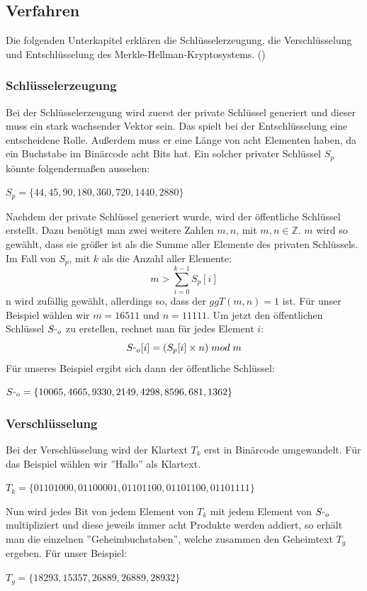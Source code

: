 \documentclass[a4paper,12pt,titlepage]{article}
\begin{document}
\subsection{Verfahren} 
Die folgenden Unterkapitel erklären die Schlüsselerzeugung, die Verschlüsselung und Entschlüsselung des Merkle-Hellman-Kryptosystems. (\cite{merklehellman_neer})
\subsubsection{Schlüsselerzeugung}
Bei der Schlüsselerzeugung wird zuerst der private Schlüssel generiert und dieser muss ein stark wachsender Vektor sein. Das spielt bei der Entschlüsselung eine entscheidene Rolle. Außerdem muss er eine Länge von acht Elementen haben, da ein Buchstabe im Binärcode acht Bits hat. Ein solcher privater Schlüssel $S_p$ könnte folgendermaßen aussehen:
\begin{center}
$S_p=\{44,45,90,180,360,720,1440,2880\}$
\end{center}
Nachdem der private Schlüssel generiert wurde, wird der öffentliche Schlüssel erstellt. Dazu benötigt man zwei weitere Zahlen $m,n$, mit $m,n \in \mathbb{Z}$. $m$ wird so gewählt, dass sie größer ist als die Summe aller Elemente des privaten Schlüssels. Im Fall von $S_p$, mit $k$ als die Anzahl aller Elemente:
\begin{equation*}
m > \sum_{i=0}^{k-1} S_p[i]
\end{equation*}
n wird zufällig gewählt, allerdings so, dass der $ggT(m, n) = 1$ ist.
Für unser Beispiel wählen wir $m = 16511$ und $n = 11111$. Um jetzt den öffentlichen Schlüssel $S_{"o}$ zu erstellen, rechnet man für jedes Element $i$:
\begin{equation*}
S_{"o}[i]=(S_p[i] \times n)\; mod \; m
\end{equation*}
Für unseres Beispiel ergibt sich dann der öffentliche Schlüssel:
\begin{center}
$S_{"o}=\{10065,4665,9330,2149,4298,8596,681,1362\}$
\end{center}

\subsubsection{Verschlüsselung}
Bei der Verschlüsselung wird der Klartext $T_k$ erst in Binärcode umgewandelt. Für das Beispiel wählen wir ''Hallo'' als Klartext.
\begin{center}
$T_k = \{01101000, 01100001, 01101100, 01101100, 01101111\}$
\end{center}
Nun wird jedes Bit von jedem Element von $T_k$ mit jedem Element von $S_{"o}$ multipliziert und diese jeweils immer acht Produkte werden addiert, so erhält man die einzelnen ''Geheimbuchstaben'', welche zusammen den Geheimtext $T_g$ ergeben.
Für unser Beispiel:
\begin{center}
$T_g=\{18293,15357,26889,26889,28932\}$
\end{center}
\end{document}
